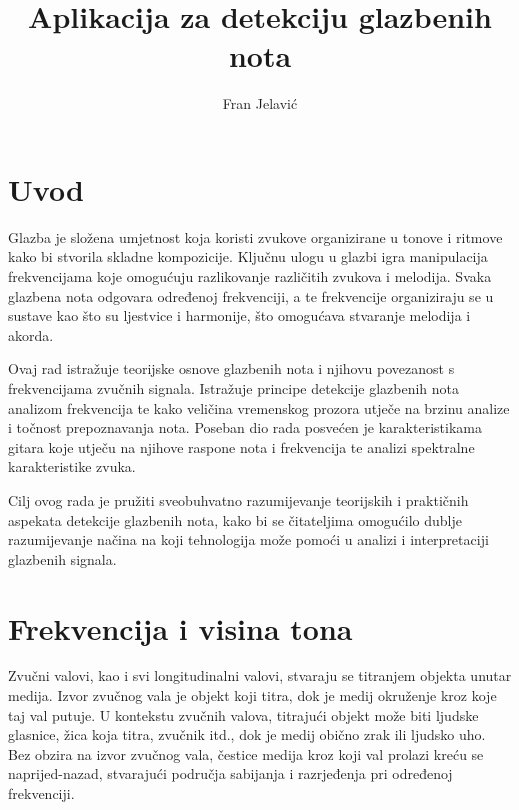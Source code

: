 \documentclass[times, utf8, diplomski, numeric]{fer}
\begin{document}

\title{Aplikacija za detekciju glazbenih nota}

\author{Fran Jelavić}

\maketitle



\zahvala{}
\tableofcontents

\chapter{Uvod}
Glazba je složena umjetnost koja koristi zvukove organizirane u tonove i ritmove kako bi stvorila skladne kompozicije. Ključnu ulogu u glazbi igra manipulacija frekvencijama koje omogućuju razlikovanje različitih zvukova i melodija. Svaka glazbena nota odgovara određenoj frekvenciji, a te frekvencije organiziraju se u sustave kao što su ljestvice i harmonije, što omogućava stvaranje melodija i akorda.

Ovaj rad istražuje teorijske osnove glazbenih nota i njihovu povezanost s frekvencijama zvučnih signala. Istražuje principe detekcije glazbenih nota analizom frekvencija te kako veličina vremenskog prozora utječe na brzinu analize i točnost prepoznavanja nota. Poseban dio rada posvećen je karakteristikama gitara koje utječu na njihove raspone nota i frekvencija te analizi spektralne karakteristike zvuka.

Cilj ovog rada je pružiti sveobuhvatno razumijevanje teorijskih i praktičnih aspekata detekcije glazbenih nota, kako bi se čitateljima omogućilo dublje razumijevanje načina na koji tehnologija može pomoći u analizi i interpretaciji glazbenih signala.
%

\chapter{Frekvencija i visina tona}
Zvučni valovi, kao i svi longitudinalni valovi, stvaraju se titranjem objekta unutar medija. Izvor zvučnog vala je objekt koji titra, dok je medij okruženje kroz koje taj val putuje. U kontekstu zvučnih valova, titrajući objekt može biti ljudske glasnice, žica koja titra, zvučnik itd., dok je medij obično zrak ili ljudsko uho. Bez obzira na izvor zvučnog vala, čestice medija kroz koji val prolazi kreću se naprijed-nazad, stvarajući područja sabijanja i razrjeđenja pri određenoj frekvenciji.
\end{document}
